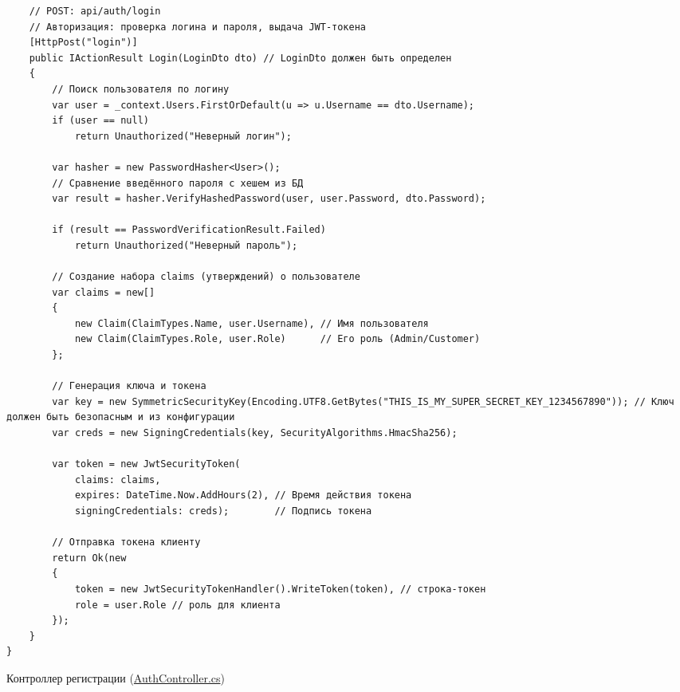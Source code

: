 \documentclass[12pt]{article}
\newcommand{\colorGIT}[1]{\textcolor{CtpLavender}{#1}}
\renewcommand{\texttt}[1]{{\small\ttfamily #1}}
\newenvironment{code}
  {\par\captionsetup{type=listing}\noindent}
  {\par\vspace{\baselineskip}}
\numberwithin{listing}{section}
\numberwithin{figure}{section}
\begin{document}
\begin{code}
\begin{verbatim}
    // POST: api/auth/login
    // Авторизация: проверка логина и пароля, выдача JWT-токена
    [HttpPost("login")]
    public IActionResult Login(LoginDto dto) // LoginDto должен быть определен
    {
        // Поиск пользователя по логину
        var user = _context.Users.FirstOrDefault(u => u.Username == dto.Username);
        if (user == null)
            return Unauthorized("Неверный логин");

        var hasher = new PasswordHasher<User>();
        // Сравнение введённого пароля с хешем из БД
        var result = hasher.VerifyHashedPassword(user, user.Password, dto.Password);

        if (result == PasswordVerificationResult.Failed)
            return Unauthorized("Неверный пароль");

        // Создание набора claims (утверждений) о пользователе
        var claims = new[]
        {
            new Claim(ClaimTypes.Name, user.Username), // Имя пользователя
            new Claim(ClaimTypes.Role, user.Role)      // Его роль (Admin/Customer)
        };

        // Генерация ключа и токена
        var key = new SymmetricSecurityKey(Encoding.UTF8.GetBytes("THIS_IS_MY_SUPER_SECRET_KEY_1234567890")); // Ключ должен быть безопасным и из конфигурации
        var creds = new SigningCredentials(key, SecurityAlgorithms.HmacSha256);

        var token = new JwtSecurityToken(
            claims: claims,
            expires: DateTime.Now.AddHours(2), // Время действия токена
            signingCredentials: creds);        // Подпись токена

        // Отправка токена клиенту
        return Ok(new
        {
            token = new JwtSecurityTokenHandler().WriteToken(token), // строка-токен
            role = user.Role // роль для клиента
        });
    }
}
\end{verbatim}
	\caption{Контроллер регистрации (\colorGIT{\href{https://github.com/WebMasterIT/Csharp_Labs/blob/2c848a1824368d20b0ec88782fee773cec93c32f/7lab_ASPNET/StoreManagerApi/Controllers/AuthController.cs}{\texttt{AuthController.cs}}})}
	\label{lst:auth_controller}
\end{code}
\end{document}
